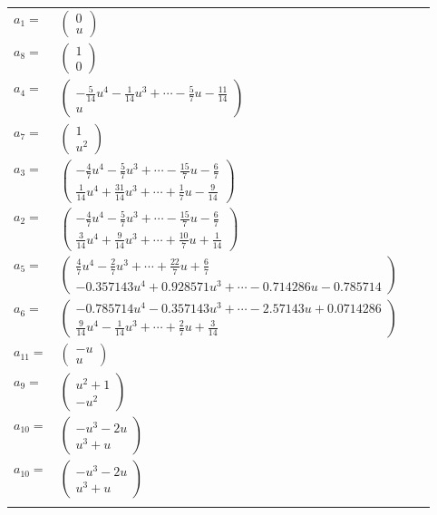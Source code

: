\documentclass[1p]{elsarticle_modified}
\theoremstyle{definition}
\begin{document}
\begin{tabular}{m{7pt} m{180pt} m{7pt} m{180pt} }
\flushright $a_{1}=$&$\begin{pmatrix}0\\u\end{pmatrix}$ \\
\flushright $a_{8}=$&$\begin{pmatrix}1\\0\end{pmatrix}$ \\
\flushright $a_{4}=$&$\begin{pmatrix}-\frac{5}{14} u^4-\frac{1}{14} u^3+\cdots-\frac{5}{7} u-\frac{11}{14}\\u\end{pmatrix}$ \\
\flushright $a_{7}=$&$\begin{pmatrix}1\\u^2\end{pmatrix}$ \\
\flushright $a_{3}=$&$\begin{pmatrix}-\frac{4}{7} u^4-\frac{5}{7} u^3+\cdots-\frac{15}{7} u-\frac{6}{7}\\\frac{1}{14} u^4+\frac{31}{14} u^3+\cdots+\frac{1}{7} u-\frac{9}{14}\end{pmatrix}$ \\
\flushright $a_{2}=$&$\begin{pmatrix}-\frac{4}{7} u^4-\frac{5}{7} u^3+\cdots-\frac{15}{7} u-\frac{6}{7}\\\frac{3}{14} u^4+\frac{9}{14} u^3+\cdots+\frac{10}{7} u+\frac{1}{14}\end{pmatrix}$ \\
\flushright $a_{5}=$&$\begin{pmatrix}\frac{4}{7} u^4-\frac{2}{7} u^3+\cdots+\frac{22}{7} u+\frac{6}{7}\\-0.357143 u^{4}+0.928571 u^{3}+\cdots-0.714286 u-0.785714\end{pmatrix}$ \\
\flushright $a_{6}=$&$\begin{pmatrix}-0.785714 u^{4}-0.357143 u^{3}+\cdots-2.57143 u+0.0714286\\\frac{9}{14} u^4-\frac{1}{14} u^3+\cdots+\frac{2}{7} u+\frac{3}{14}\end{pmatrix}$ \\
\flushright $a_{11}=$&$\begin{pmatrix}- u\\u\end{pmatrix}$ \\
\flushright $a_{9}=$&$\begin{pmatrix}u^2+1\\- u^2\end{pmatrix}$ \\
\flushright $a_{10}=$&$\begin{pmatrix}- u^3-2 u\\u^3+u\end{pmatrix}$\\ \flushright $a_{10}=$&$\begin{pmatrix}- u^3-2 u\\u^3+u\end{pmatrix}$\\&\end{tabular}
\end{document}
